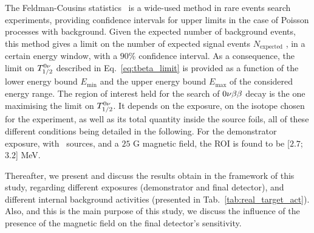 
The Feldman-Cousins statistics~\cite{art:feld-cous} is a wide-used method in rare events search experiments, providing confidence intervals for upper limits in the case of Poisson processes with background.
Given the expected number of background events, this method gives a limit on the number of expected signal events $N_{\text{expected}}$ , in a certain energy window, with a $90\%$ confidence interval.
As a consequence, the limit on $T_{1/2}^{0\nu}$ described in Eq.~\eqref{eq:tbeta_limit} is provided as a function of the lower energy bound $E_{\text{min}}$ and the upper energy bound $E_{\text{max}}$ of the considered energy range.
The region of interest held for the search of $0\nu\beta\beta$ decay is the one maximising the limit on $T_{1/2}^{0\nu}$.
It depends on the exposure, on the isotope chosen for the experiment, as well as its total quantity inside the source foils, all of these different conditions being detailed in the following.
For the demonstrator exposure, with \Se\ sources, and a $25$ G magnetic field, the ROI is found to be [$2.7$;$3.2$] MeV.

Thereafter, we present and discuss the results obtain in the framework of this study, regarding different exposures (demonstrator and final detector), and different internal background activities (presented in Tab.~\ref{tab:real_target_act}).
Also, and this is the main purpose of this study, we discuss the influence of the presence of the magnetic field on the final detector's sensitivity.

